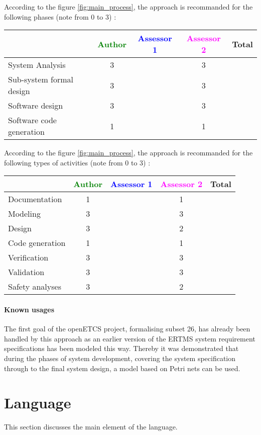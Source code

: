 According to the figure \ref{fig:main_process}, the approach is recommanded for the following phases (note from 0 to  3) :

\begin{tabular}{|l | c | c | c | c|}
\hline
& \textcolor{green}{Author} & \textcolor{blue}{Assessor 1} & \textcolor{magenta}{Assessor 2} & Total \\
\hline 
System Analysis & 3 & & 3 &  \\
\hline
Sub-system formal design & 3 & & 3 & \\
\hline
Software design & 3 & & 3 & \\
\hline
Software code generation & 1 & & 1 & \\
\hline
\end{tabular}

According to the figure \ref{fig:main_process}, the approach is recommanded for the following types of activities (note from 0 to  3) :

\begin{tabular}{|l | c | c | c | c|}
\hline
& \textcolor{green}{Author} & \textcolor{blue}{Assessor 1} & \textcolor{magenta}{Assessor 2} & Total \\
\hline 
Documentation & 1 & & 1 &  \\
\hline
Modeling & 3 & & 3 &  \\
\hline
Design & 3 & & 2 & \\
\hline
Code generation & 1 & & 1 & \\
\hline
Verification & 3 & & 3 & \\
\hline
Validation & 3 & & 3 & \\
\hline
Safety analyses & 3 & & 2 & \\
\hline
\end{tabular}

\paragraph{Known usages} 

The first goal of the openETCS project, formalising subset 26, has already been handled by this approach as  an earlier version of the ERTMS system requirement specifications has been modeled this way. Thereby it  was  demonstrated  that  during  the  phases  of  system development, covering the system specification through to the final system design, a  model based on Petri nets can be used.

\section{Language}
This section discusses the main element of the language.

